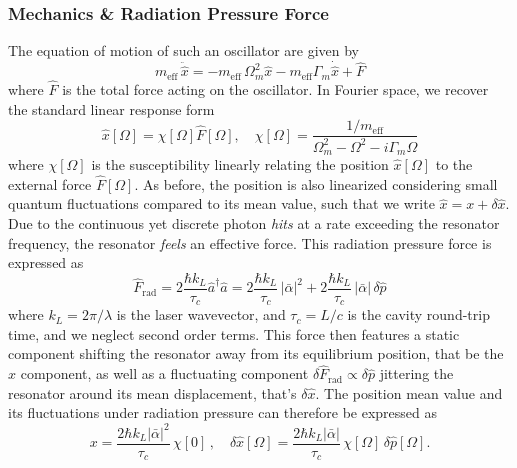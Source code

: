\subsubsection{Mechanics \& Radiation Pressure Force }
The equation of motion of such an oscillator are given by 
\begin{equation}
  m_{\text{eff}} \, \ddot{\hat x} = -m_{\text{eff}} \, \Omega_m^2 \hat x - m_{\text{eff}} \Gamma_m \dot{\hat x} + \hat F
\end{equation}
where $\hat F$ is the total force acting on the oscillator.
In Fourier space, we recover the standard linear response form
\begin{equation}
  \hat x [\Omega] = \chi[\Omega] \hat F[\Omega], \quad \chi[\Omega] = \frac{1/m_{\text{eff}}}{\Omega_m^2 - \Omega^2 - i \Gamma_m \Omega}
\end{equation}
where $\chi[\Omega]$ is the susceptibility linearly relating the position $\hat x [\Omega]$ to the external force $\hat F[\Omega]$. As before, the position is also linearized considering small quantum fluctuations compared to its mean value, such that we write $\hat{x}= x + \delta \hat{x}$. Due to the continuous yet discrete photon \textit{hits} at a rate exceeding the resonator frequency, the resonator \textit{feels} an effective force. This radiation pressure force is expressed as 
\begin{equation}
  \hat F_{\textrm{rad}} = 2 \frac{\hbar k_L}{\tau_c}\hat{a}^\dagger \hat{a} = 2 \frac{\hbar k_L}{\tau_c} \, |\bar{\alpha}|^2 +2 \frac{\hbar k_L}{\tau_c} \, |\bar \alpha| \, \delta \hat{p}
\label{eq:Frad}
\end{equation}
where $k_L = 2\pi / \lambda$ is the laser wavevector, and $\tau_c=L/c$ is the cavity round-trip time, and we neglect second order terms. This force then features a static component shifting the resonator away from its equilibrium position, that be the $x$ component, as well as a fluctuating component $\delta \hat F_{\mathrm{rad}}\propto \delta \hat{p}$ jittering the resonator around its mean displacement, that's $\delta \hat x$. The position mean value and its fluctuations under radiation pressure can therefore be expressed as 
\begin{equation}
  x = \frac{2\hbar k_L |\bar \alpha|^2}{\tau_c}  \,  \chi[0] \, , \quad \delta \hat x [\Omega]= \frac{2\hbar k_L |\bar \alpha|}{\tau_c}  \,  \chi[\Omega] \,  \delta \hat{p}[\Omega]. \label{eq:dx}
\end{equation} 
